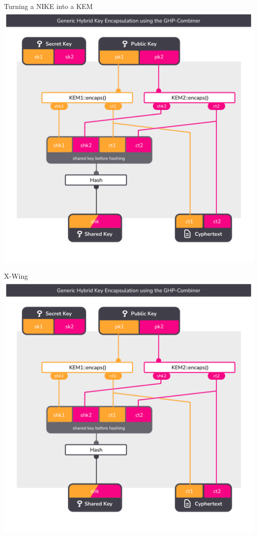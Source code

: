 \begin{frame}{Turning a NIKE into a KEM}
  \centering
  \includegraphics[height=.92\textheight,page=2,clip=true,trim={0.5cm 1cm 0.7cm 1.5cm}]{graphics/rosenpass-encapsulation-combiner.pdf}
\end{frame}

\begin{frame}{X-Wing}
  \centering
  \includegraphics[height=.92\textheight,page=3,clip=true,trim={0.5cm 1cm 0.7cm 1.5cm}]{graphics/rosenpass-encapsulation-combiner.pdf}
\end{frame}

